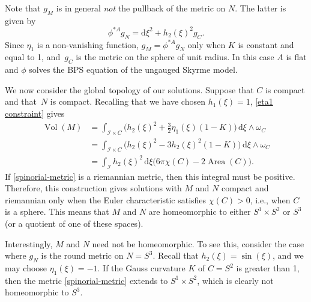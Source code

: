 \documentclass[pdftex]{sigma}
\newcommand{\II}{{\mathcal{I}}}
\newcommand{\1}{{\mathbb{1}}}
\def \d{\mathrm{d}}
\numberwithin{equation}{section}
\begin{document}
Note that $g_M$ is in general \emph{not} the pullback of the metric on $N$. The latter is given by
\begin{equation*}
\phi^{\ast A}g_N = \d\xi^2 + h_2(\xi)^{2}g_C.
\end{equation*}
Since $\eta_1$ is a non-vanishing function, $g_M=\phi^{\ast A} g_N$ only when $K$ is constant and equal to 1, and~$g_C$ is the metric on the sphere of unit radius. In this case $A$ is flat and $\phi$ solves the BPS equation of the ungauged Skyrme model.

We now consider the global topology of our solutions. Suppose that $C$ is compact and that~$N$ is compact. Recalling that we have chosen $h_1(\xi)=1$, \eqref{eta1 constraint} gives
\begin{equation*}
\begin{aligned}
\operatorname{Vol}(M)&=
\int_{\II\times C}\bigl(h_2(\xi)^{2}+\tfrac32\eta_1(\xi)(1-K)\bigr)\,\d\xi\wedge\omega_C \\
&= \int_{\II\times C}\bigl(h_2(\xi)^{2}-3h_2(\xi)^2(1-K)\bigr)\,\d\xi\wedge\omega_C \\
&= \int_{\II}h_2(\xi)^{2}\,\d\xi\bigl(6\pi\chi(C)-2\operatorname{Area}(C)\bigr).
\end{aligned}
\end{equation*}
If \eqref{spinorial-metric} is a riemannian metric, then this integral must be positive. Therefore, this construction gives solutions with $M$ and $N$ compact and riemannian only when the Euler characteristic satisfies $\chi(C)>0$, i.e., when $C$ is a sphere. This means that $M$ and $N$ are homeomorphic to either $S^1\times S^2$ or $S^3$ (or a quotient of one of these spaces).

Interestingly, $M$ and $N$ need not be homeomorphic. To see this, consider the case where $g_N$ is the round metric on $N=S^3$. Recall that $h_2(\xi)=\sin(\xi)$, and we may choose $\eta_1(\xi)=-1$. If the Gauss curvature $K$ of $C=S^2$ is greater than 1, then the metric \eqref{spinorial-metric} extends to $S^1\times S^2$, which is clearly not homeomorphic to $S^3$.
\end{document}
